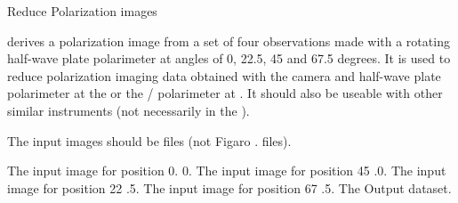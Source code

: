 \begin{manroutinedescription}
        Reduce {} Polarization images

        {} derives a polarization image from a set of four %
observations
        made with a rotating half-wave plate polarimeter at angles of
        0, 22.5, 45 and 67.5 degrees. It is used to reduce polarization
        imaging data obtained with the {} {} camera and %
half-wave plate
        polarimeter at the {} or the {}/{} %
polarimeter at {}.
        It should also be useable with other similar instruments (not
        necessarily in the {}).

        The input images should be {} files (not Figaro .{} files).

\begin{manparametertable}
     The input image for position 0.%
0.
     The input image for position 45%
.0.
     The input image for position 22%
.5.
     The input image for position 67%
.5.
  The %
Output dataset.

\end{manparametertable}
\end{manroutinedescription}
